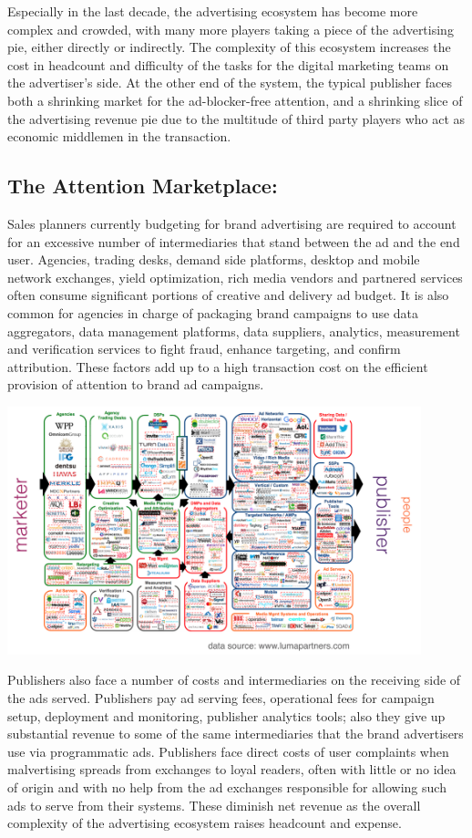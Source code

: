 \documentclass[11pt]{article}
\begin{document}
Especially in the last decade, the advertising ecosystem has become more complex and crowded, with many more players taking a piece of the advertising pie, either directly or indirectly. The complexity of this ecosystem increases the cost in headcount and difficulty of the tasks for the digital marketing teams on the advertiser's side. At the other end of the system, the typical publisher faces both a shrinking market for the ad-blocker-free attention, and a shrinking slice of the advertising revenue pie due to the multitude of third party players who act as economic middlemen in the transaction. 

\subsection{The Attention Marketplace:}
\label{sec-3-2}

Sales planners currently budgeting for brand advertising are required to account for an excessive number of intermediaries that stand between the ad and the end user. Agencies, trading desks, demand side platforms, desktop and mobile network exchanges, yield optimization, rich media vendors and partnered services often consume significant portions of creative and delivery ad budget. It is also common for agencies in charge of packaging brand campaigns to use data aggregators, data management platforms, data suppliers, analytics, measurement and verification services to fight fraud, enhance targeting, and confirm attribution. These factors add up to a high transaction cost on the efficient provision of attention to brand ad campaigns.

\begin{center}
\includegraphics[width=0.9\textwidth]{lumascape_recolored.png}
\end{center}

Publishers also face a number of costs and intermediaries on the receiving side of the ads served. Publishers pay ad serving fees, operational fees for campaign setup, deployment and monitoring, publisher analytics tools; also they give up substantial revenue to some of the same intermediaries that the brand advertisers use via programmatic ads. Publishers face direct costs of user complaints when malvertising spreads from exchanges to loyal readers, often with little or no idea of origin and with no help from the ad exchanges responsible for allowing such ads to serve from their systems. These diminish net revenue as the overall complexity of the advertising ecosystem raises headcount and expense.
\end{document}
